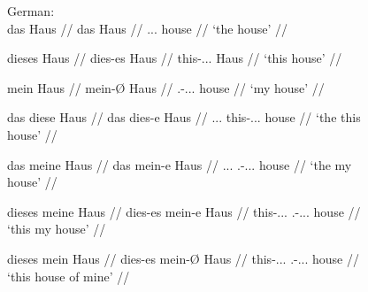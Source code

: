 \begin{figure}
\pex\label{ex:germandetdist}
	\a German:\medskip \\
	\begingl
		\gla das Haus //
		\glb das Haus //
		\glc \Def{}.\Nom{}.\Sg{}.\N{} house //
		\glft `the house' //
	\endgl

	\a\begingl
		\gla dieses Haus //
		\glb dies-es Haus //
		\glc this-\Nom{}.\Sg{}.\N{}.\St{} Haus //
		\glft `this house' //
	\endgl

	\a\begingl
		\gla mein Haus //
		\glb mein-Ø Haus //
		\glc \Fsg{}.\Gen{}-\Nom{}.\Sg{}.\N{}.\St{} house //
		\glft `my house' //
	\endgl

	\a\ljudge*\begingl
		\gla das diese Haus //
		\glb das dies-e Haus //
		\glc \Def{}.\Nom{}.\Sg{}.\N{} this-\Nom{}.\Sg{}.\N{}.\Wk{} house //
		\glft `the this house' //
	\endgl

	\a\ljudge*\begingl
		\gla das meine Haus //
		\glb das mein-e Haus //
		\glc \Def{}.\Nom{}.\Sg{}.\N{} \Fsg{}.\Gen{}-\Nom{}.\Sg{}.\N{}.\Wk{} 
			house //
		\glft `the my house' //
	\endgl

	\a\ljudge*\label{ex:germandemposswk}\begingl
		\gla dieses meine Haus //
		\glb dies-es mein-e Haus //
		\glc this-\Nom{}.\Sg{}.\N{}.\St{} 
			\Fsg{}.\Gen{}-\Nom{}.\Sg{}.\N{}.\Wk{} house //
		\glft `this my house' //
	\endgl

	\a\ljudge\hash\label{ex:germandemposs}\begingl
		\gla dieses mein Haus //
		\glb dies-es mein-Ø Haus //
		\glc this-\Nom{}.\Sg{}.\N{}.\St{} 
			\Fsg{}.\Gen{}-\Nom{}.\Sg{}.\N{}.\St{} house //
		\glft `this house of mine' //
	\endgl
\xe
\end{figure}

